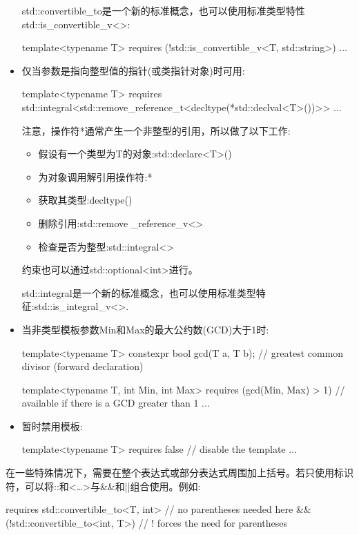 \begin{itemize}
std::convertible\_to是一个新的标准概念，也可以使用标准类型特性std::is\_convertible\_v<>:

\begin{cpp}
template<typename T>
requires (!std::is_convertible_v<T, std::string>)
...
\end{cpp}

\item
仅当参数是指向整型值的指针(或类指针对象)时可用:

\begin{cpp}
template<typename T>
requires std::integral<std::remove_reference_t<decltype(*std::declval<T>())>>
...
\end{cpp}

注意，操作符*通常产生一个非整型的引用，所以做了以下工作:

\begin{itemize}
\item
假设有一个类型为T的对象:std::declare<T>()

\item
为对象调用解引用操作符:*

\item
获取其类型:decltype()

\item
删除引用:std::remove \_reference\_v<>

\item
检查是否为整型:std::integral<>
\end{itemize}

约束也可以通过std::optional<int>进行。

std::integral是一个新的标准概念，也可以使用标准类型特征:std::is\_integral\_v<>.

\item
当非类型模板参数Min和Max的最大公约数(GCD)大于1时:

\begin{cpp}
template<typename T>
constexpr bool gcd(T a, T b); // greatest common divisor (forward declaration)

template<typename T, int Min, int Max>
requires (gcd(Min, Max) > 1) // available if there is a GCD greater than 1
...
\end{cpp}

\item
暂时禁用模板:

\begin{cpp}
template<typename T>
requires false // disable the template
...
\end{cpp}
\end{itemize}

在一些特殊情况下，需要在整个表达式或部分表达式周围加上括号。若只使用标识符，可以将::和<…>与\&\&和||组合使用。例如:

\begin{cpp}
requires std::convertible_to<T, int> // no parentheses needed here
		&&
		(!std::convertible_to<int, T>) // ! forces the need for parentheses
\end{cpp}


























